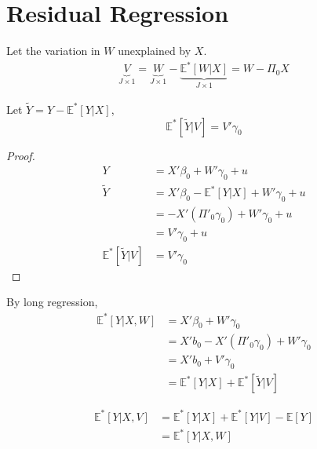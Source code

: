 \documentclass[11pt]{elegantbook}
\begin{document}
\section{Residual Regression}
Let the variation in $W$ unexplained by $X$.
\begin{equation}
    \begin{aligned}
        \underbrace{V}_{J\times 1}=\underbrace{W}_{J\times 1}-\underbrace{\mathbb{E}^*[W|X]}_{J\times 1}=W-\Pi_0X
    \end{aligned}
    \nonumber
\end{equation}
\begin{proposition}
    Let $\tilde{Y}=Y-\mathbb{E}^*[Y|X]$,
    $$\mathbb{E}^*[\tilde{Y}|V]=V'\gamma_0$$
\end{proposition}
\begin{proof}
    \begin{equation}
        \begin{aligned}
            Y&=X'\beta_0+W'\gamma_0+u\\
            \tilde{Y}&=X'\beta_0-\mathbb{E}^*[Y|X]+W'\gamma_0+u\\
            &=-X'(\Pi'_0\gamma_0)+W'\gamma_0+u\\
            &=V'\gamma_0+u\\
            \mathbb{E}^*[\tilde{Y}|V]&=V'\gamma_0
        \end{aligned}
        \nonumber
    \end{equation}
\end{proof}
By long regression,
\begin{equation}
    \begin{aligned}
        \mathbb{E}^*[Y|X,W]&=X'\beta_0+W'\gamma_0\\
        &=X'b_0-X'(\Pi'_0\gamma_0)+W'\gamma_0\\
        &=X'b_0+V'\gamma_0\\
        &=\mathbb{E}^*[Y|X]+\mathbb{E}^*[\tilde{Y}|V]
    \end{aligned}
    \nonumber
\end{equation}

\begin{theorem}
    \begin{equation}
        \begin{aligned}
            \mathbb{E}^*[Y|X,V]&=\mathbb{E}^*[Y|X]+\mathbb{E}^*[Y|V]-\mathbb{E}[Y]\\
            &=\mathbb{E}^*[Y|X,W]
        \end{aligned}
        \nonumber
    \end{equation}
\end{theorem}
\end{document}
